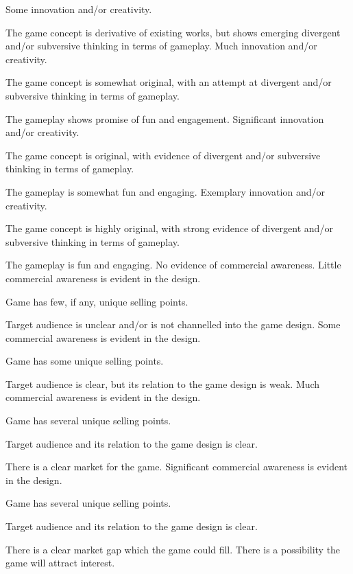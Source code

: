 \documentclass{../fal_assignment}
\begin{document}
\begin{markingrubric}
        \grade Some innovation and/or creativity.
            \par The game concept is derivative of existing works, but shows emerging divergent and/or subversive thinking in terms of gameplay.
        \grade Much innovation and/or creativity.
            \par The game concept is somewhat original, with an attempt at divergent and/or subversive thinking in terms of gameplay.
            \par The gameplay shows promise of fun and engagement.
        \grade Significant innovation and/or creativity.
            \par The game concept is original, with evidence of divergent and/or subversive thinking in terms of gameplay.
            \par The gameplay is somewhat fun and engaging.
        \grade Exemplary innovation and/or creativity.
            \par The game concept is highly original, with strong evidence of divergent and/or subversive thinking in terms of gameplay.
            \par The gameplay is fun and engaging.
%
        \grade\fail No evidence of commercial awareness.
        \grade Little commercial awareness is evident in the design.
            \par Game has few, if any, unique selling points.
            \par Target audience is unclear and/or is not channelled into the game design.
        \grade Some commercial awareness is evident in the design.
            \par Game has some unique selling points.
            \par Target audience is clear, but its relation to the game design is weak.
        \grade Much commercial awareness is evident in the design.
            \par Game has several unique selling points.
            \par Target audience and its relation to the game design is clear.
            \par There is a clear market for the game.
        \grade Significant commercial awareness is evident in the design.
            \par Game has several unique selling points.
            \par Target audience and its relation to the game design is clear.
            \par There is a clear market gap which the game could fill. There is a possibility the game will attract interest.

\end{markingrubric}
\end{document}
